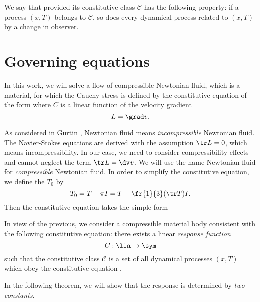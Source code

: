 We say that  provided
its constitutive class $\mathcal C$ has the following property: if a process $(x,T)$ belongs 
to $\mathcal C$, so does every dynamical process related to $(x,T)$ by a change in observer.

\chapter{Governing equations}

In this work, we will solve a flow of compressible Newtonian fluid, which is a
material, for which the Cauchy stress is defined by the constitutive equation of
the form
where $C$ is a linear function of the velocity gradient $$L=\grad v.$$

As considered in Gurtin \cite[p. 147]{gurtin}, Newtonian fluid means {\it incompressible} Newtonian 
fluid. The Navier-Stokes equations are derived with the assumption $\tr L=0$, which means 
incompressibility. In our case, we need to consider compressibility effects and cannot neglect 
the term $\tr L=\dv v$. We will use the name Newtonian fluid for 
{\it compressible} Newtonian fluid.
In order to simplify the constitutive equation, we define the 
$T_0$ by $$T_0=T+\pi I=T-\fr{1}{3}(\tr T)I.$$
Then the constitutive equation  takes the simple form

In view of the previous, we consider  a compressible 
material body consistent with the following constitutive equation: 
there exists a linear {\it response function} $$C:\lin \rightarrow \sym$$ such that 
the constitutive class $\mathcal C$ is a set of all dynamical processes $(x,T)$ 
which obey the constitutive equation .

In the following theorem, we will show that the response is determined by {\it two constants}. 

